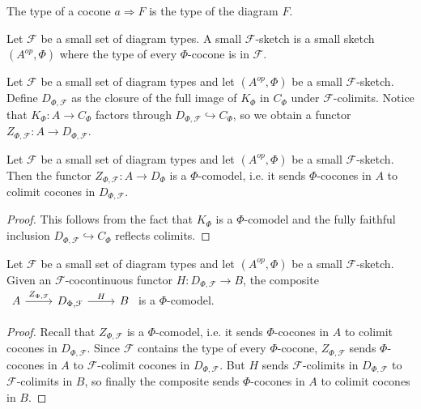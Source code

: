 \begin{definition}
 The type of a cocone $a\Rightarrow F$ is the type of the diagram $F$.\end{definition}

\begin{definition}
Let $\mathcal{F}$ be a small set of diagram types. A small $\mathcal{F}$-sketch is a small sketch $(A^{op},\Phi)$ where the type of every $\Phi$-cocone is in $\mathcal{F}$.\end{definition}


\begin{definition}

Let $\mathcal{F}$ be a small set of diagram types and let $(A^{op},\Phi)$ be a small $\mathcal{F}$-sketch. Define $D_{\Phi,\mathcal{F}}$ as the closure of the full image of $K_{\Phi}$ in $C_{\Phi}$ under $\mathcal{F}$-colimits. Notice that $K_{\Phi}:A\to C_{\Phi}$ factors through $D_{\Phi,\mathcal{F}}\hookrightarrow C_{\Phi}$, so we obtain a functor $Z_{\Phi,\mathcal{F}}:A\to D_{\Phi,\mathcal{F}}$.\end{definition}

\begin{lemma}
Let $\mathcal{F}$ be a small set of diagram types and let $(A^{op},\Phi)$ be a small $\mathcal{F}$-sketch. Then the functor $Z_{\Phi,\mathcal{F}}:A\to D_{\Phi}$ is a $\Phi$-comodel, i.e. it sends $\Phi$-cocones in $A$ to colimit cocones in $D_{\Phi,\mathcal{F}}$.
\end{lemma}
\begin{proof}
This follows from the fact that $K_{\Phi}$ is a $\Phi$-comodel and the fully faithful inclusion $D_{\Phi,\mathcal{F}}\hookrightarrow C_{\Phi}$ reflects colimits.\end{proof}

\begin{lemma}
Let $\mathcal{F}$ be a small set of diagram types and let $(A^{op},\Phi)$ be a small $\mathcal{F}$-sketch. Given an $\mathcal{F}$-cocontinuous functor $H:D_{\Phi,\mathcal{F}}\to B$, the composite $\begin{tikzcd}
	A & D_{\Phi,\mathcal{F}} & B
	\arrow["Z_{\Phi,\mathcal{F}}", from=1-1, to=1-2]
	\arrow["H", from=1-2, to=1-3]
\end{tikzcd}$ is a $\Phi$-comodel.\end{lemma}
 \begin{proof}Recall that $Z_{\Phi,\mathcal{F}}$ is a $\Phi$-comodel, i.e. it sends $\Phi$-cocones in $A$ to colimit cocones in $D_{\Phi,\mathcal{F}}$. Since $\mathcal{F}$ contains the type of every $\Phi$-cocone, $Z_{\Phi,\mathcal{F}}$ sends $\Phi$-cocones in $A$ to $\mathcal{F}$-colimit cocones in $D_{\Phi,\mathcal{F}}$. But $H$ sends $\mathcal{F}$-colimits in $D_{\Phi,\mathcal{F}}$ to $\mathcal{F}$-colimits in $B$, so finally the composite sends $\Phi$-cocones in $A$ to colimit cocones in $B$.\end{proof}

